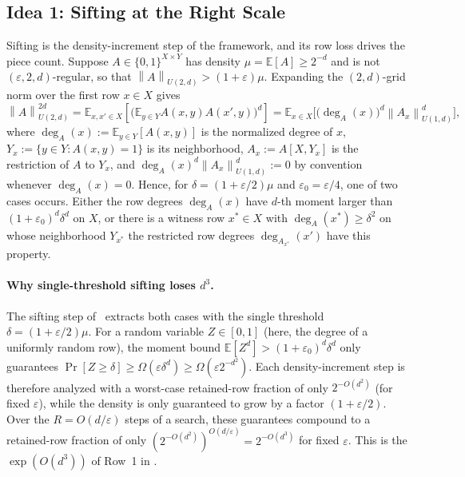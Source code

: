 \documentclass[11pt]{article}
\theoremstyle{definition}
\renewcommand{\label}[1]{}%
\newcommand{\E}{\mathbb{E}}
\newcommand{\norm}[1]{\left\lVert #1 \right\rVert}
\newcommand{\dens}[1]{\E[#1]}
\begin{document}
\subsection{Idea 1: Sifting at the Right Scale}
\label{sec:overview-sift}

Sifting is the density-increment step of the framework, and its row loss drives the piece count. Suppose $A \in \{0, 1\}^{X \times Y}$ has density $\mu = \dens{A} \ge 2^{-d}$ and is not $(\varepsilon, 2, d)$-regular, so that $\norm{A}_{U(2, d)} > (1 + \varepsilon)\mu$. Expanding the $(2, d)$-grid norm over the first row $x \in X$ gives
\begin{equation}\label{eq:overview-u2d}
    \norm{A}_{U(2, d)}^{2d} = \E_{x, x' \in X}\!\left[\big(\E_{y \in Y} A(x, y)A(x', y)\big)^d\right] = \E_{x \in X}\!\Big[\big(\deg_A(x)\big)^d \norm{A_x}_{U(1, d)}^d\Big],
\end{equation}
where $\deg_A(x) := \E_{y \in Y}[A(x, y)]$ is the normalized degree of $x$, $Y_x := \{y \in Y : A(x, y) = 1\}$ is its neighborhood, $A_x := A[X, Y_x]$ is the restriction of $A$ to $Y_x$, and $\deg_A(x)^d \norm{A_x}_{U(1, d)}^d := 0$ by convention whenever $\deg_A(x) = 0$. Hence, for $\delta = (1 + \varepsilon/2)\mu$ and $\varepsilon_0 = \varepsilon/4$, one of two cases occurs. Either the row degrees $\deg_A(x)$ have $d$-th moment larger than $(1 + \varepsilon_0)^d\delta^d$ on $X$, or there is a witness row $x^* \in X$ with $\deg_A(x^*) \ge \delta^2$ on whose neighborhood $Y_{x^*}$ the restricted row degrees $\deg_{A_{x^*}}(x')$ have this property.

\paragraph{Why single-threshold sifting loses $d^3$.}
The sifting step of~\cite[Lemma~4.2 \& Algorithm~4.1]{AFKLM24} extracts both cases with the single threshold $\delta = (1 + \varepsilon/2)\mu$. For a random variable $Z \in [0, 1]$ (here, the degree of a uniformly random row), the moment bound $\E[Z^d] > (1 + \varepsilon_0)^d \delta^d$ only guarantees $\Pr[Z \ge \delta] \ge \Omega(\varepsilon \delta^d) \ge \Omega(\varepsilon 2^{-d^2})$. Each density-increment step is therefore analyzed with a worst-case retained-row fraction of only $2^{-O(d^2)}$ (for fixed $\varepsilon$), while the density is only guaranteed to grow by a factor $(1 + \varepsilon/2)$. Over the $R = O(d/\varepsilon)$ steps of a search, these guarantees compound to a retained-row fraction of only $(2^{-O(d^2)})^{O(d/\varepsilon)} = 2^{-O(d^3)}$ for fixed $\varepsilon$. This is the $\exp(O(d^3))$ of Row~1 in .
\end{document}

